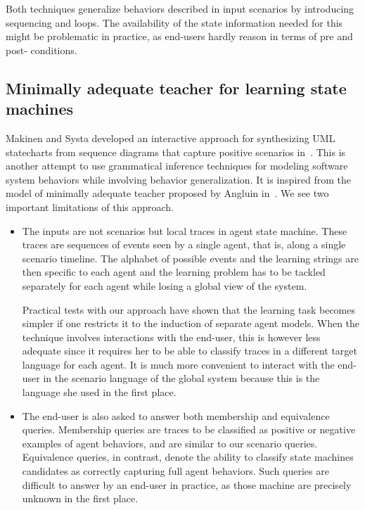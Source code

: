 Both techniques generalize behaviors described in input scenarios by introducing sequencing and loops. The availability of the state information needed for this might be problematic in practice, as end-users hardly reason in terms of pre and post- conditions.

\subsection*{Minimally adequate teacher for learning state machines}

Makinen and Systa developed an interactive approach for synthesizing UML statecharts from sequence diagrams that capture positive scenarios in~\cite{Makinen:2001}. This is another attempt to use grammatical inference techniques for modeling software system behaviors while involving behavior generalization. It is inspired from the model of minimally adequate teacher proposed by Angluin in~\cite{Angluin:1987}. We see two important limitations of this approach.

\begin{itemize}

\item The inputs are not scenarios but local traces in agent state machine. These traces are sequences of events seen by a single agent, that is, along a single scenario timeline. The alphabet of possible events and the learning strings are then specific to each agent and the learning problem has to be tackled separately for each agent while losing a global view of the system. 

Practical tests with our approach have shown that the learning task becomes simpler if one restricts it to the induction of separate agent models. When the technique involves interactions with the end-user, this is however less adequate since it requires her to be able to classify traces in a different target language for each agent. It is much more convenient to interact with the end-user in the scenario language of the global system because this is the language she used in the first place.

\item The end-user is also asked to answer both membership and equivalence queries. Membership queries are traces to be classified as positive or negative examples of agent behaviors, and are similar to our scenario queries. Equivalence queries, in contrast, denote the ability to classify state machines candidates as correctly capturing full agent behaviors. Such queries are difficult to answer by an end-user in practice, as those machine are precisely unknown in the first place. 

\end{itemize}

